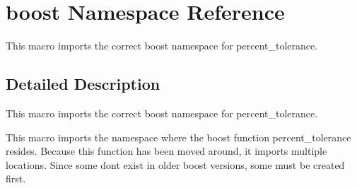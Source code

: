 \hypertarget{namespaceboost}{}\section{boost Namespace Reference}
\label{namespaceboost}


This macro imports the correct boost namespace for percent\+\_\+tolerance.  




\subsection{Detailed Description}
This macro imports the correct boost namespace for percent\+\_\+tolerance. 

This macro imports the namespace where the boost function percent\+\_\+tolerance resides. Because this function has been moved around, it imports multiple locations. Since some don\textquotesingle{}t exist in older boost versions, some must be created first. 